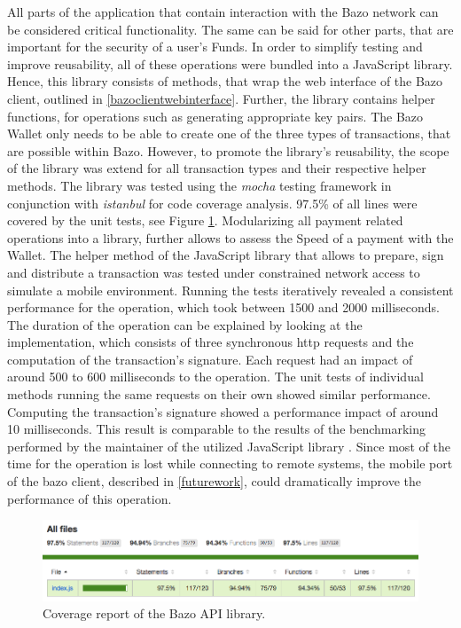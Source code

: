 All parts of the application that contain interaction with the Bazo network can be considered critical functionality. The same can be said for other parts, that are important for the security of a user's Funds. In order to simplify testing and improve reusability, all of these operations were bundled into a JavaScript library. Hence, this library consists of methods, that wrap the web interface of the Bazo client, outlined in \ref{bazoclientwebinterface}. Further, the library contains helper functions, for operations such as generating appropriate key pairs. The Bazo Wallet only needs to be able to create one of the three types of transactions, that are possible within Bazo. However, to promote the library's reusability, the scope of the library was extend for all transaction types and their respective helper methods.
The library was tested using the \textit{mocha} testing framework in conjunction with \textit{istanbul} for code coverage analysis. 97.5\% of all lines were covered by the unit tests, see Figure \ref{fig:coverage}. Modularizing all payment related operations into a library, further allows to assess the Speed of a payment with the Wallet. The helper method of the JavaScript library that allows to prepare, sign and distribute a transaction was tested under constrained network access to simulate a mobile environment. Running the tests iteratively revealed a consistent performance for the operation, which took between 1500 and 2000 milliseconds. The duration of the operation can be explained by looking at the implementation, which consists of three synchronous http requests and the computation of the transaction's signature. Each request had an impact of around 500 to 600 milliseconds to the operation. The unit tests of individual methods running the same requests on their own showed similar performance. Computing the transaction's signature showed a performance impact of around 10 milliseconds. This result is comparable to the results of the benchmarking performed by the maintainer of the utilized JavaScript library \cite{elliptic}. 
Since most of the time for the operation is lost while connecting to remote systems, the mobile port of the bazo client, described in \ref{futurework}, could dramatically improve the performance of this operation.

\begin{figure}
\centering
\includegraphics[width=1\textwidth]{screenshots/bazo-api-testing.png}
\caption{\label{fig:coverage}Coverage report of the Bazo API library.}
\end{figure}

